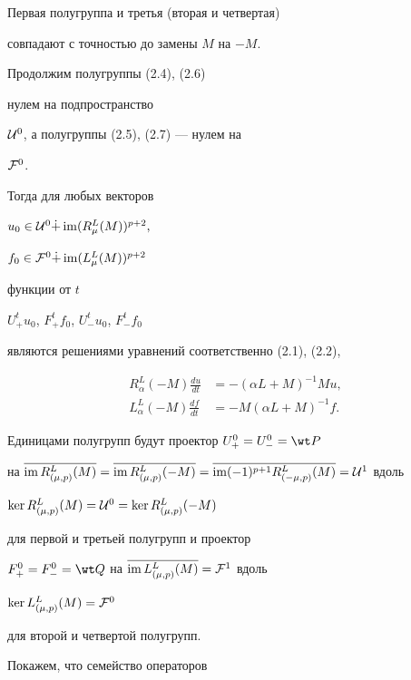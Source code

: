 \begin{pf}
Первая полугруппа и третья (вторая и четвертая)


совпадают с точностью до замены $M$ на $-M$.


Продолжим полугруппы (2.4), (2.6)


нулем  на подпространство


${\cal U}^0$, а полугруппы (2.5), (2.7) --- нулем на


${\cal F}^0$.


Тогда для любых векторов


$u_0\in{\cal U}^0\Dot +\operatorname{im}(R_{\mu}^L(M))^{p+2},$


$f_0\in{\cal F}^0\Dot +\operatorname{im}(L_{\mu}^L(M))^{p+2}$


функции от $t$\;


$U^t_+u_0$, $F^t_+f_0$, $U^t_-u_0$, $F^t_-f_0$


являются решениями уравнений соответственно (2.1), (2.2),


\begin{equation}


\begin{split}


R^L_\alpha (-M) \frac{du}{dt}&=-(\alpha L+M)^{-1}M u, \\


L^L_\alpha (-M) \frac{df}{dt}&=-M(\alpha L+M)^{-1}f.


\end{split}


\end{equation}





Единицами полугрупп будут проектор $U^0_+=U^0_-=\wt P$


на $\overline{\im R_{(\mu ,p)}^L(M)}=


\overline{\im R_{(\mu ,p)}^L(-M)}=


\overline{\im (-1)^{p+1}R_{(-\mu ,p)}^L(M)}={\cal U}^1$ вдоль


$\ker R_{(\mu, p)}^L(M)={\cal U}^0=\ker R_{(\mu,p)}^L(-M)$


для первой и третьей полугрупп и проектор


$F^0_+=F^0_-=\wt Q$ на $\overline{\operatorname{im} L_{(\mu, p)}^L(M)}={\cal F}^1$ вдоль


$\ker L_{(\mu, p)}^L(M)={\cal F}^0$


для второй и четвертой полугрупп.





Покажем, что семейство операторов



\end{pf}

